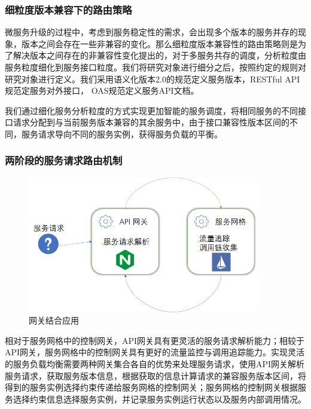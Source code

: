 \subsubsection{细粒度版本兼容下的路由策略}

微服务升级的过程中，考虑到服务稳定性的需求，会出现多个版本的服务并存的现象，版本之间会存在一些非兼容的变化。那么细粒度版本兼容性的路由策略则是为了解决版本之间存在的非兼容性变化提出的，对于多服务共存的调度，分析粒度由服务粒度细化到服务接口粒度。我们将研究对象进行细分之后，按照约定的规则对研究对象进行定义。我们采用语义化版本2.0的规范定义服务版本，RESTful API规范定服务对外接口，
OAS规范定义服务API文档。\par
我们通过细化服务分析粒度的方式实现更加智能的服务调度，将相同服务的不同接口请求分配到与当前服务版本兼容的其余服务中，由于接口兼容性版本区间的不同，服务请求导向不同的服务实例，获得服务负载的平衡。

\subsubsection{两阶段的服务请求路由机制}

\begin{figure}[H]
    \centering
    \includegraphics[width=0.9\textwidth]{Img/网关结合.png}
    \caption{网关结合应用}
    \label{fig:gateway_to}
\end{figure}

相对于服务网格中的控制网关，API网关具有更灵活的服务请求解析能力；相较于API网关，服务网格中的控制网关具有更好的流量监控与调用追踪能力。实现灵活的服务负载均衡需要两种网关集合各自的优势来处理服务请求，使用API网关解析服务请求，获取服务版本信息，根据获取的信息计算请求的兼容服务版本区间，将得到的服务实例选择约束传递给服务网格的控制网关；服务网格的控制网关根据服务选择约束信息选择服务实例，并记录服务实例运行状态以及服务内部调用情况。

